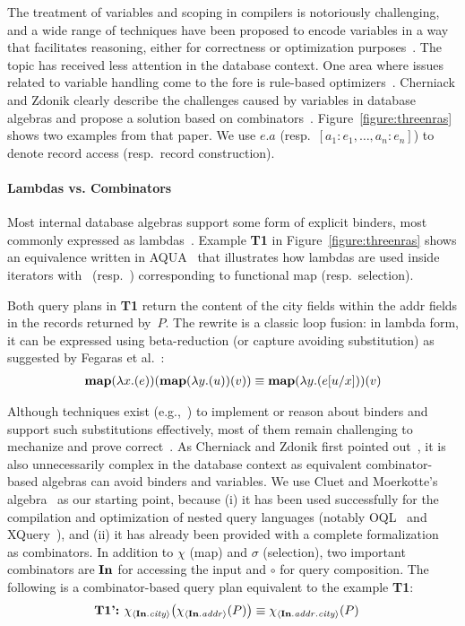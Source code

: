The treatment of variables and scoping in compilers is notoriously
challenging, and a wide range of techniques have been proposed to
encode variables in a way that facilitates reasoning, either for
correctness or optimization purposes~\cite{AydemirBFFPSVWWZ05}. The
topic has received less attention in the database context. One area
where issues related to variable handling come to the fore is
rule-based
optimizers~\cite{CareyDFGRSM91,cherniack1996rule,CherniackZ98,FegarasMS93,LeungMSVVZ93,PiraheshHH92}.
Cherniack and Zdonik clearly describe the challenges caused by
variables in database algebras and propose a solution based on
combinators~\cite{cherniack1996rule}. Figure~\ref{figure:threenras}
shows two examples from that paper. We use $e.a$ (resp.\ $[a_1:e_1,
  \ldots, a_n:e_n]$) to denote record access (resp.\ record
construction).

\paragraph*{Lambdas vs. Combinators}

Most internal database algebras support some form of explicit binders,
most commonly expressed as
lambdas~\cite{CareyDFGRSM91,cherniack1996rule,FegarasMS93}.  Example
\textbf{T1} in Figure~\ref{figure:threenras} shows an equivalence
written in AQUA~\cite{LeungMSVVZ93} that illustrates how lambdas are
used inside iterators with \lmapop\ (resp.\ \lselop) corresponding to
functional map (resp.\ selection).

Both query plans in \textbf{T1} return the content of the city fields
within the addr fields in the records returned by~$P$. The rewrite is
a classic loop fusion: in lambda form, it can be expressed using
beta-reduction (or capture avoiding substitution) as suggested by
Fegaras et al.~\cite{FegarasMS93}:
\begin{align*}
  \textup{\textbf{{map}}}(\lambda x.(e))(\textup{\textbf{{map}}}(\lambda y.(u))(v)) \equiv \textup{\textbf{{map}}}(\lambda y.(e[u/x]))(v)
\end{align*}

Although techniques exist (e.g.,~\cite{abadi1991explicit}) to
implement or reason about binders and support such substitutions
effectively, most of them remain challenging to mechanize and prove
correct~\cite{AydemirBFFPSVWWZ05}. As Cherniack and Zdonik first
pointed out~\cite{cherniack1996rule}, it is also unnecessarily complex
in the database context as equivalent combinator-based algebras can
avoid binders and variables. We use Cluet and Moerkotte's
algebra~\cite{CluetM93} as our starting point, because (i) it has been
used successfully for the compilation and optimization of nested query
languages (notably OQL~\cite{CluetM93} and XQuery~\cite{MayHM04}), and
(ii) it has already been provided with a complete
formalization~\cite{ShinnarSH15} as combinators. In addition to $\chi$
(map) and $\sigma$ (selection), two important combinators are $\textup{\textbf{{In}}}$
for accessing the input and $\circ$ for query composition. The
following is a combinator-based query plan equivalent to the example
\textbf{T1}:
\begin{align*}
  \textbf{T1':~} \chi_{\left\langle{\textup{\textbf{{In}}}.\mathit{city}}\right\rangle}\!\left({\chi_{\left\langle{\textup{\textbf{{In}}}.\mathit{addr}}\right\rangle}\!\left({P}\right)}\right) & \equiv \chi_{\left\langle{\textup{\textbf{{In}}}.\mathit{addr}.\mathit{city}}\right\rangle}\!\left({P}\right)
\end{align*}

